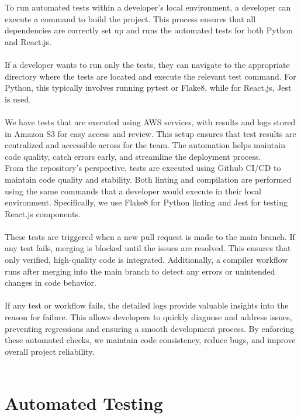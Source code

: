 \documentclass[12pt, titlepage]{article}
\begin{document}
To run automated tests within a developer’s local environment, a developer can execute a command to build the project. This process ensures that all dependencies are correctly set up and runs the automated tests for both Python and React.js.\\\\
If a developer wants to run only the tests, they can navigate to the appropriate directory where the tests are located and execute the relevant test command. For Python, this typically involves running pytest or Flake8, while for React.js, Jest is used.\\\\
We have tests that are executed using AWS services, with results and logs stored in Amazon S3 for easy access and review. This setup ensures that test results are centralized and accessible across for the team. The automation helps maintain code quality, catch errors early, and streamline the deployment process.\\
From the repository’s perspective, tests are executed using Github CI/CD to maintain code quality and stability. Both linting and compilation are performed using the same commands that a developer would execute in their local environment. Specifically, we use Flake8 for Python linting and Jest for testing React.js components.\\\\
These tests are triggered when a new pull request is made to the main branch. If any test fails, merging is blocked until the issues are resolved. This ensures that only verified, high-quality code is integrated. Additionally, a compiler workflow runs after merging into the main branch to detect any errors or unintended changes in code behavior.\\\\
If any test or workflow fails, the detailed logs provide valuable insights into the reason for failure. This allows developers to quickly diagnose and address issues, preventing regressions and ensuring a smooth development process. By enforcing these automated checks, we maintain code consistency, reduce bugs, and improve overall project reliability.\\\\

\section{Automated Testing}
		
\end{document}

